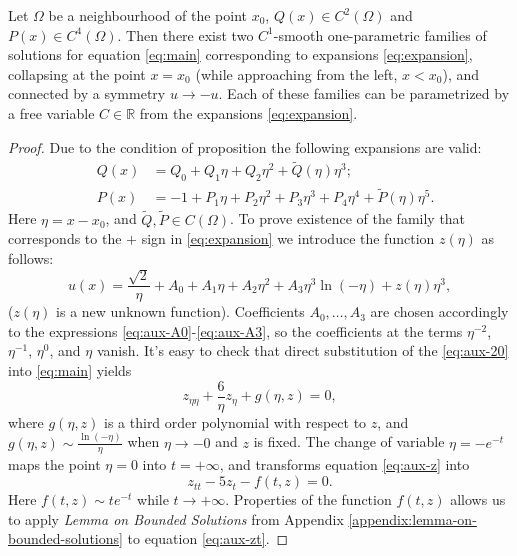 \begin{proposition}
	Let $\Omega$ be a neighbourhood of the point $x_0$, $Q(x) \in C^2(\Omega)$ and $P(x) \in C^4(\Omega)$.
	Then there exist two $C^1$-smooth one-parametric families of solutions for equation \eqref{eq:main} corresponding to expansions \eqref{eq:expansion}, collapsing at the point $x = x_0$ (while approaching from the left, $x < x_0$), and connected by a symmetry $u \to -u$.
	Each of these families can be parametrized by a free variable $C \in \mathbb{R}$ from the expansions \eqref{eq:expansion}.
\label{prop:singular-families}
\end{proposition}
\begin{proof}
	Due to the condition of proposition the following expansions are valid:
	\begin{eqnarray}
		& Q(x) & = Q_0 + Q_1 \eta + Q_2 \eta^2 + \widetilde{Q}(\eta) \eta^3; \\
		& P(x) & = -1 + P_1 \eta + P_2 \eta^2 + P_3 \eta^3 + P_4 \eta^4 + \widetilde{P}(\eta) \eta^5.
	\end{eqnarray}
	Here $\eta = x - x_0$, and $\widetilde{Q}, \widetilde{P} \in C(\Omega)$.
	To prove existence of the family that corresponds to the $+$ sign in \eqref{eq:expansion}	 we introduce the function $z(\eta)$ as follows:
	\begin{equation}
		u(x) = \dfrac{\sqrt{2}}{\eta} + A_0 + A_1 \eta + A_2 \eta^2 + A_3 \eta^3 \ln(-\eta) + z(\eta) \eta^3,
		\label{eq:aux-20}
	\end{equation}
	($z(\eta)$ is a new unknown function).
	Coefficients $A_0, \dots, A_3$ are chosen accordingly to the expressions \eqref{eq:aux-A0}-\eqref{eq:aux-A3}, so the coefficients at the terms $\eta^{-2}$, $\eta^{-1}$, $\eta^0$, and $\eta$ vanish.
	It's easy to check that direct substitution of the \eqref{eq:aux-20} into \eqref{eq:main} yields
	\begin{equation}
		z_{\eta\eta} + \dfrac{6}{\eta} z_{\eta} + g(\eta, z) = 0,
		\label{eq:aux-z}
	\end{equation}
	where $g(\eta, z)$ is a third order polynomial with respect to $z$, and $g(\eta, z) \sim \frac{\ln(-\eta)}{\eta}$ when $\eta \to -0$ and $z$ is fixed.
	The change of variable $\eta = -e^{-t}$ maps the point $\eta = 0$ into $t = +\infty$, and transforms equation \eqref{eq:aux-z} into
	\begin{equation}
		z_{tt} - 5z_t - f(t, z) = 0.
		\label{eq:aux-zt}
	\end{equation}
	Here $f(t, z) \sim t e^{-t}$ while $t \to +\infty$.
	Properties of the function $f(t, z)$ allows us to apply {\it Lemma on Bounded Solutions} from Appendix \ref{appendix:lemma-on-bounded-solutions} to equation \eqref{eq:aux-zt}.

\end{proof}
